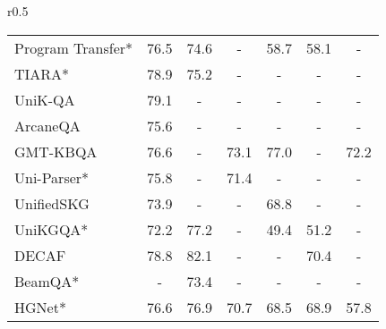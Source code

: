 \documentclass{article} \usepackage{iclr2024_conference,times}
\begin{document}
\begin{wraptable}{r}{0.5\textwidth}
{\begin{tabular}{lcccccc}
Program Transfer*                & 76.5          & 74.6                                         & \multicolumn{1}{c|}{-}             & 58.7          & 58.1                                         & -             \\
TIARA*                           & 78.9          & 75.2                                         & \multicolumn{1}{c|}{-}             & -             & -                                            & -             \\
UniK-QA                          & 79.1          & -                                            & \multicolumn{1}{c|}{-}             & -             & -                                            & -             \\
ArcaneQA                         & 75.6          & -                                            & \multicolumn{1}{c|}{-}             & -             & -                                            & -             \\
GMT-KBQA                         & 76.6          & -                                            & \multicolumn{1}{c|}{73.1}          & 77.0          & -                                            & 72.2          \\
Uni-Parser*                      & 75.8          & -                                            & \multicolumn{1}{c|}{71.4}          & -             & -                                            & -             \\
UnifiedSKG                       & 73.9          & -                                            & \multicolumn{1}{c|}{-}             & 68.8          & -                                            & -             \\
UniKGQA*                         & 72.2          & 77.2                                         & \multicolumn{1}{c|}{-}             & 49.4          & 51.2                                         & -             \\
DECAF                            & 78.8          & 82.1                                         & \multicolumn{1}{c|}{-}             & -             & 70.4                                         & -             \\
BeamQA*                          & -             & 73.4                                         & \multicolumn{1}{c|}{-}             & -             & -                                            & -             \\
HGNet*                           & 76.6          & 76.9                                         & \multicolumn{1}{c|}{70.7}          & 68.5          & 68.9                                         & 57.8          \\

\end{tabular}}
\end{wraptable}
\end{document}
